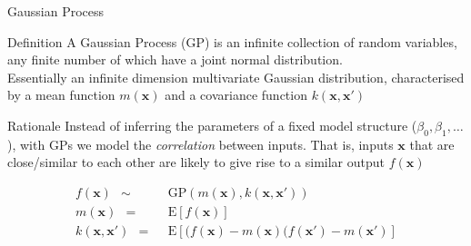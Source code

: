 \documentclass[pdf]{beamer}
\begin{document}

\begin{frame}{Gaussian Process}

\begin{block}{Definition}
A Gaussian Process (GP) is an infinite collection of random variables, any finite number of which have a joint normal distribution.
\\
Essentially an infinite dimension multivariate Gaussian distribution, characterised by a mean function $m(\mathbf{x})$ and a covariance function $k(\mathbf{x},\mathbf{x}')$ 
\end{block}

\begin{block}{Rationale}
Instead of inferring the parameters of a fixed model structure ($\beta_0,\beta_1,\ldots$), with GPs we model the \textit{correlation}
between inputs. That is, inputs $\mathbf{x}$ that are close/similar to each other are likely to give rise to a similar
output $f(\mathbf{x})$  
\end{block}
\vspace{-1cm}
\begin{align}
f(\mathbf{x})\ \ \sim\ \ &\mathrm{GP}(m(\mathbf{x}),k(\mathbf{x},\mathbf{x}'))\nonumber\\
m(\mathbf{x})\ \ =\ \ &\mathrm{E}[f(\mathbf{x})]\nonumber\\
k(\mathbf{x},\mathbf{x}')\ \ =\ \ &\mathrm{E}[(f(\mathbf{x})-m(\mathbf{x})(f(\mathbf{x}')-m(\mathbf{x}')]\nonumber
\end{align} 

\end{frame}
\end{document}
